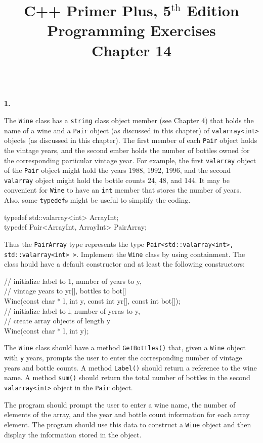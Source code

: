 \documentclass[10 pt]{amsart}
\newlength{\cwidth}
\newenvironment{cpart}[2][\cwidth]
	{%
		\\ %
		\textbf{#2. }%
		\begin{minipage}[t]{#1}%
		\setlength{\parindent}{0pt}%
		\setlength{\parskip}{2ex}%
	}
	{%
		\end{minipage}%
	}
\newcommand{\ttt}[1]{\texttt{#1}}
\newcommand{\ChapNum}{14}
\begin{document}
	\title
	[Chapter \ChapNum]
	{C++ Primer Plus, 5$^\text{th}$ Edition \\
	Programming Exercises \\
	Chapter \ChapNum}

	\maketitle

	\begin{cpart}{1}
		The \ttt{Wine} class has a \ttt{string} class object member 
		(see Chapter 4) that holds the name of a wine and a 
		\ttt{Pair} object (as discussed in this chapter) of 
		\ttt{valarray<int>} objects (as discussed in this chapter).
		The first member of each \ttt{Pair} object holds the 
		vintage years, and the second ember holds the number of
		bottles owned for the corresponding particular vintage
		year.
		For example, the first \ttt{valarray} object of the \ttt{Pair}
		object might hold the years 1988, 1992, 1996, and the second
		\ttt{valarray} object might hold the bottle counts 24, 48, 
		and 144. 
		It may be convenient for \ttt{Wine} to have an \ttt{int}
		member that stores the number of years. 
		Also, some \ttt{typedef}s might be useful to simplify the
		coding. 

		{\ttfamily
			typedef std::valarray<int> ArrayInt; \\
			typedef Pair<ArrayInt, ArrayInt> PairArray;
		}

		Thus the \ttt{PairArray} type represents the type
		\ttt{Pair<std::valarray<int>, std::valarray<int> >}.
		Implement the \ttt{Wine} class by using containment.
		The class hould have a default constructor and
		at least the following constructors: 

		{ \ttfamily
			// initialize label to 1, number of years to y,  \\
			// vintage years to yr[], bottles to bot[] \\
			Wine(const char * l, int y, const int yr[], const int bot[]); \\
			// initialize label to l, number of yeras to y, \\
			// create array objects of length y \\
			Wine(const char * l, int y); 
		}

		The \ttt{Wine} class should have a method \ttt{GetBottles()}
		that, given a \ttt{Wine} object with \ttt{y} years, 
		prompts the user to enter the corresponding number of vintage
		years and bottle counts.
		A method \ttt{Label()} should return a reference to the wine
		name. 
		A method \ttt{sum()} should return the total number of
		bottles in the second \ttt{valarray<int>} object in the
		\ttt{Pair} object.

		The program should prompt the user to enter a wine name,
		the number of elements of the array, and the year and bottle
		count information for each array element. 
		The program should use this data to construct a \ttt{Wine}
		object and then display the information stored in the
		object.
	\end{cpart}
\end{document}
